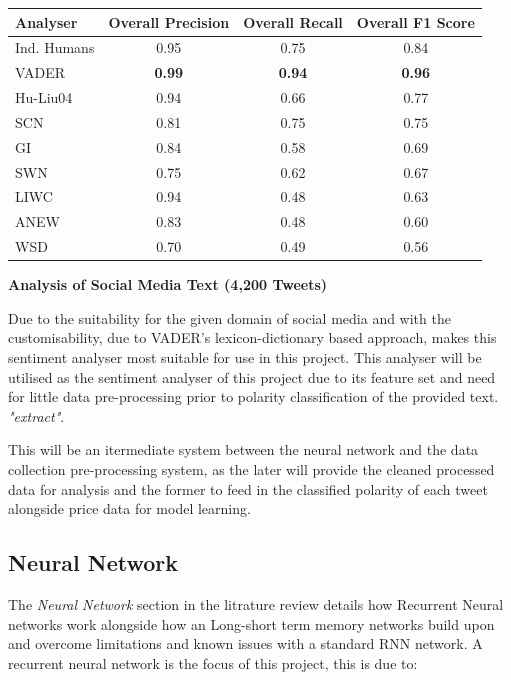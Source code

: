 \documentclass[oneside, 10pt]{article}
\begin{document}
		\begin{center}
			\begin{tabular}{l|c|c|c}
				\textbf{Analyser} & \textbf{Overall Precision} & \textbf{Overall Recall} & \textbf{Overall F1 Score}\\
				\hline
				\multirow{1}{*}{Ind. Humans} & 0.95 & 0.75 & 0.84 \\
				\multirow{1}{*}{VADER} & \textbf{0.99} & \textbf{0.94} & \textbf{0.96} \\
				\multirow{1}{*}{Hu-Liu04} & 0.94 & 0.66 & 0.77 \\
				\multirow{1}{*}{SCN} & 0.81 & 0.75 & 0.75 \\
				\multirow{1}{*}{GI} & 0.84 & 0.58 & 0.69 \\
				\multirow{1}{*}{SWN} & 0.75 & 0.62 & 0.67 \\
				\multirow{1}{*}{LIWC} & 0.94 & 0.48 & 0.63 \\
				\multirow{1}{*}{ANEW} & 0.83 & 0.48 & 0.60 \\
				\multirow{1}{*}{WSD} & 0.70 & 0.49 & 0.56 \\
			\end{tabular}
		
				\textbf{Analysis of Social Media Text (4,200 Tweets)}\cite{12}
		\end{center}
		
		Due to the suitability for the given domain of social media and with the customisability, due to VADER's lexicon-dictionary based approach, makes this sentiment analyser most suitable for use in this project. This analyser will be utilised as the sentiment analyser of this project due to its feature set and need for little data pre-processing prior to polarity classification of the provided text. \cite{11} \textit{"extract"}.
		
		This will be an itermediate system between the neural network and the data collection pre-processing system, as the later will provide the cleaned processed data for analysis and the former to feed in the classified polarity of each tweet alongside price data for model learning.
		
		\subsection{Neural Network}
		The \textit{Neural Network} section in the litrature review details how Recurrent Neural networks work alongside how an Long-short term memory networks build upon and overcome limitations and known issues with a standard RNN network. A recurrent neural network is the focus of this project, this is due to:
		
\end{document}

